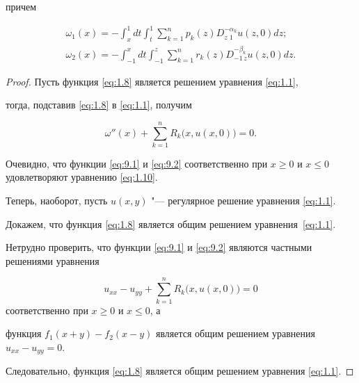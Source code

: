 причем

\begin{gather}

{\omega _1}(x) =  -  \int _x^1 {dt \int _t^1 {\sum\limits_{k = 1}^n {{p_k}(z)D_{z\,\,1}^{ - {\alpha _k}}u(z, 0)} d} } z ; \label{eq:9.1}

\\

{\omega _2}(x) =  -  \int _{ - 1}^x {dt \int _{ - 1}^z {\sum\limits_{k = 1}^n {{r_k}(z)D_{ - 1\,z}^{ - {\beta _k}}u(z, 0)} d} } z. \label{eq:9.2}

\end{gather}



\rm



\smallskip



\begin{proof}

Пусть функция \eqref{eq:1.8} является решением уравнения \eqref{eq:1.1}, 

тогда, подставив \eqref{eq:1.8} в \eqref{eq:1.1}, получим

 \begin{equation}

 \omega ''(x) + \sum\limits_{k = 1}^n {R_k} \bigl(x, u(x, 0) \bigr)  = 0.

 \label{eq:1.10}

 \end{equation}

Очевидно, что функции \eqref{eq:9.1} и \eqref{eq:9.2} соответственно при $x \ge 0$ и $x \le 0$ удовлетворяют уравнению \eqref{eq:1.10}.

Теперь, наоборот, пусть $u(x,y)$  "--- регулярное решение уравнения \eqref{eq:1.1}. 

Докажем, что функция \eqref{eq:1.8} является общим решением уравнения~\eqref{eq:1.1}.



Нетрудно проверить, что функции  \eqref{eq:9.1} и \eqref{eq:9.2} являются частными решениями уравнения 

$${u_{xx}} - {u_{yy}} + \sum\limits_{k = 1}^n {R_k} \bigl(x,u(x, 0)\bigr)  = 0$$ соответственно при $x \ge 0$ и $x \le 0$, а

функция ${f_1}(x + y) - {f_2}(x - y)$ является общим решением уравнения ${u_{xx}} - {u_{yy}} = 0$.



Следовательно, функция \eqref{eq:1.8} является общим решением уравнения \eqref{eq:1.1}. 

\end{proof}



